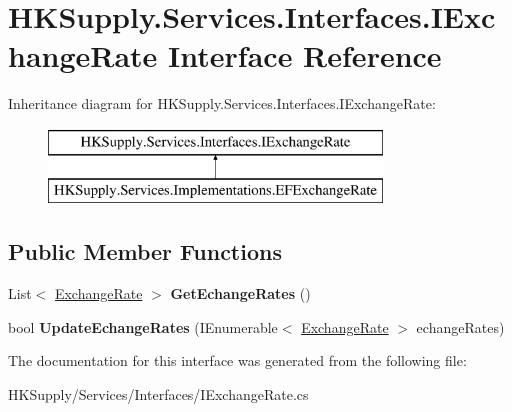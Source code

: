 \hypertarget{interface_h_k_supply_1_1_services_1_1_interfaces_1_1_i_exchange_rate}{}\section{H\+K\+Supply.\+Services.\+Interfaces.\+I\+Exchange\+Rate Interface Reference}
\label{interface_h_k_supply_1_1_services_1_1_interfaces_1_1_i_exchange_rate}
Inheritance diagram for H\+K\+Supply.\+Services.\+Interfaces.\+I\+Exchange\+Rate\+:\begin{figure}[H]
\begin{center}
\leavevmode
\includegraphics[height=2.000000cm]{interface_h_k_supply_1_1_services_1_1_interfaces_1_1_i_exchange_rate}
\end{center}
\end{figure}
\subsection*{Public Member Functions}
\begin{DoxyCompactItemize}
\item 
\mbox{\label{interface_h_k_supply_1_1_services_1_1_interfaces_1_1_i_exchange_rate_a815c14ce3b1e3abfd7baa3697fa6791c}} 
List$<$ \mbox{\hyperlink{class_h_k_supply_1_1_models_1_1_exchange_rate}{Exchange\+Rate}} $>$ {\bfseries Get\+Echange\+Rates} ()
\item 
\mbox{\label{interface_h_k_supply_1_1_services_1_1_interfaces_1_1_i_exchange_rate_ae748229433829786b74f28cad6eebe74}} 
bool {\bfseries Update\+Echange\+Rates} (I\+Enumerable$<$ \mbox{\hyperlink{class_h_k_supply_1_1_models_1_1_exchange_rate}{Exchange\+Rate}} $>$ echange\+Rates)
\end{DoxyCompactItemize}


The documentation for this interface was generated from the following file\+:\begin{DoxyCompactItemize}
\item 
H\+K\+Supply/\+Services/\+Interfaces/I\+Exchange\+Rate.\+cs\end{DoxyCompactItemize}
